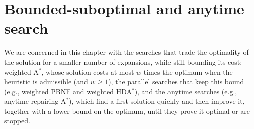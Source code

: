 \chapter{Bounded-suboptimal and anytime search}\label{ch:bounded-suboptimal}

\begin{center}
\end{center}

We are concerned in this chapter with the searches that trade the optimality of
the solution for a smaller number of expansions, while still bounding its cost:
weighted A$^*$, whose solution costs at most $w$ times the optimum when the
heuristic is admissible (and $w \ge 1$), the parallel searches that keep this
bound (e.g., weighted PBNF and weighted HDA$^*$), and the anytime searches
(e.g., anytime repairing A$^*$), which find a first solution quickly and then
improve it, together with a lower bound on the optimum, until they prove it
optimal or are stopped.

